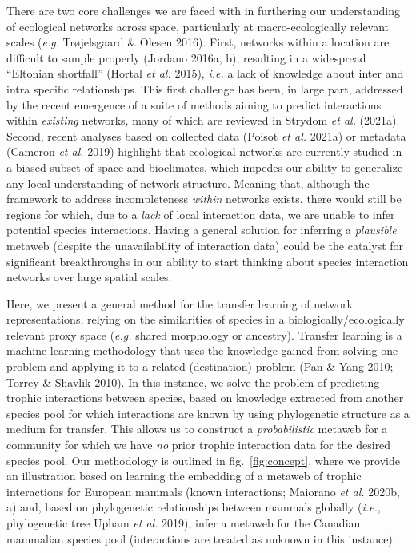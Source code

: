 \documentclass[10pt,oneside]{article}
\begin{document}
There are two core challenges we are faced with in furthering our
understanding of ecological networks across space, particularly at
macro-ecologically relevant scales (\emph{e.g.} Trøjelsgaard \& Olesen
2016). First, networks within a location are difficult to sample
properly (Jordano 2016a, b), resulting in a widespread ``Eltonian
shortfall'' (Hortal \emph{et al.} 2015), \emph{i.e.} a lack of knowledge
about inter and intra specific relationships. This first challenge has
been, in large part, addressed by the recent emergence of a suite of
methods aiming to predict interactions within \emph{existing} networks,
many of which are reviewed in Strydom \emph{et al.} (2021a). Second,
recent analyses based on collected data (Poisot \emph{et al.} 2021a) or
metadata (Cameron \emph{et al.} 2019) highlight that ecological networks
are currently studied in a biased subset of space and bioclimates, which
impedes our ability to generalize any local understanding of network
structure. Meaning that, although the framework to address
incompleteness \emph{within} networks exists, there would still be
regions for which, due to a \emph{lack} of local interaction data, we
are unable to infer potential species interactions. Having a general
solution for inferring a \emph{plausible} metaweb (despite the
unavailability of interaction data) could be the catalyst for
significant breakthroughs in our ability to start thinking about species
interaction networks over large spatial scales.

Here, we present a general method for the transfer learning of network
representations, relying on the similarities of species in a
biologically/ecologically relevant proxy space (\emph{e.g.} shared
morphology or ancestry). Transfer learning is a machine learning
methodology that uses the knowledge gained from solving one problem and
applying it to a related (destination) problem (Pan \& Yang 2010; Torrey
\& Shavlik 2010). In this instance, we solve the problem of predicting
trophic interactions between species, based on knowledge extracted from
another species pool for which interactions are known by using
phylogenetic structure as a medium for transfer. This allows us to
construct a \emph{probabilistic} metaweb for a community for which we
have \emph{no} prior trophic interaction data for the desired species
pool. Our methodology is outlined in fig.~\ref{fig:concept}, where we
provide an illustration based on learning the embedding of a metaweb of
trophic interactions for European mammals (known interactions; Maiorano
\emph{et al.} 2020b, a) and, based on phylogenetic relationships between
mammals globally (\emph{i.e.}, phylogenetic tree Upham \emph{et al.}
2019), infer a metaweb for the Canadian mammalian species pool
(interactions are treated as unknown in this instance).
\end{document}

